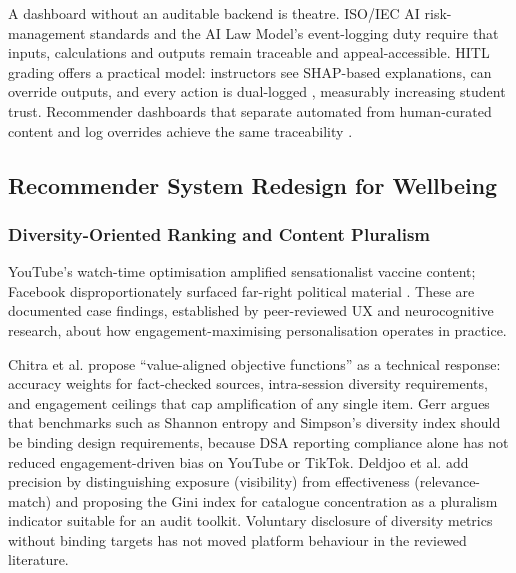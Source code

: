 \documentclass[11pt]{article}
\begin{document}
A dashboard without an auditable backend is theatre. ISO/IEC AI risk-management standards and the AI Law Model's event-logging duty require \parencites[2]{8589961}[44]{2977039}[135]{2977039} that inputs, calculations and outputs remain traceable and appeal-accessible. HITL grading offers a practical model: instructors see SHAP-based explanations, can override outputs, and every action is dual-logged \parencites[20]{6805789}{2055956}, measurably increasing student trust. Recommender dashboards that separate automated from human-curated content and log overrides achieve the same traceability \parencites[22]{2977039}[61--62]{2977039}.

\subsection{Recommender System Redesign for Wellbeing}

\subsubsection{Diversity-Oriented Ranking and Content Pluralism}
\label{sec:diversity_ranking_pluralism} YouTube's watch-time optimisation amplified sensationalist vaccine content; Facebook disproportionately surfaced far-right political material \parencites[5]{5142478}[29]{5142478}[7]{5142478}. These are documented case findings, established by peer-reviewed UX and neurocognitive research, about how engagement-maximising personalisation operates in practice.

Chitra et al. propose \parencites[16]{6502223} ``value-aligned objective functions'' as a technical response: accuracy weights for fact-checked sources, intra-session diversity requirements, and engagement ceilings that cap amplification of any single item. Gerr argues \parencites[8]{5142478}[28]{5142478} that benchmarks such as Shannon entropy and Simpson's diversity index should be binding design requirements, because DSA reporting compliance alone has not reduced engagement-driven bias on YouTube or TikTok. Deldjoo et al. add precision \parencites[28]{6577872}[30]{6577872} by distinguishing exposure (visibility) from effectiveness (relevance-match) and proposing the Gini index for catalogue concentration as a pluralism indicator suitable for an audit toolkit. Voluntary disclosure of diversity metrics without binding targets has not moved platform behaviour in the reviewed literature.
\end{document}
